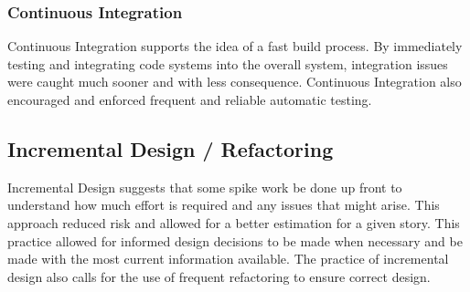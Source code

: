 \subsubsection{Continuous Integration}
Continuous Integration supports the idea of a fast build process. By immediately testing and integrating code systems into the overall system, integration issues were caught much sooner and with less consequence. Continuous Integration also encouraged and enforced frequent and reliable automatic testing.

\subsection{Incremental Design / Refactoring}
Incremental Design suggests that some spike work be done up front to understand how much effort is required and any issues that might arise. This approach reduced risk and allowed for a better estimation for a given story. This practice allowed for informed design decisions to be made when necessary and be made with the most current information available. The practice of incremental design also calls for the use of frequent refactoring to ensure correct design.

